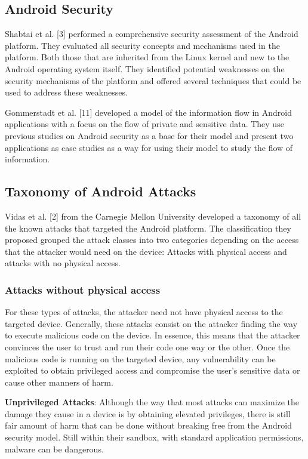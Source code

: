 \documentclass[conference]{IEEEtran}
\begin{document}
\subsection{Android Security}

Shabtai et al. [3] performed a comprehensive security assessment of the Android platform. They evaluated all security concepts and mechanisms used in the platform. Both those that are inherited from the Linux kernel and new to the Android operating system itself. They identified potential weaknesses on the security mechanisms of the platform and offered several techniques that could be used to address these weaknesses. 

Gommerstadt et al. [11] developed a model of the information flow in Android applications with a focus on the flow of private and sensitive data. They use previous studies on Android security as a base for their model and present two applications as case studies as a way for using their model to study the flow of information.

\subsection{Taxonomy of Android Attacks}

Vidas et al. [2] from the Carnegie Mellon University developed a taxonomy of all the known attacks that targeted the Android platform. The classification they proposed grouped the attack classes into two categories depending on the access that the attacker would need on the device: Attacks with physical access and attacks with no physical access.

\subsubsection{Attacks without physical access}

For these types of attacks, the attacker need not have physical access to the targeted device. Generally, these attacks consist on the attacker finding the way to execute malicious code on the device. In essence, this means that the attacker convinces the user to trust and run their code one way or the other. Once the malicious code is running on the targeted device, any vulnerability can be exploited to obtain privileged access and compromise the user's sensitive data or cause other manners of harm.

\textbf{Unprivileged Attacks}: Although the way that most attacks can maximize the damage they cause in a device is by obtaining elevated privileges, there is still fair amount of harm that can be done without breaking free from the Android security model. Still within their sandbox, with standard application permissions, malware can be dangerous. 
\end{document}
